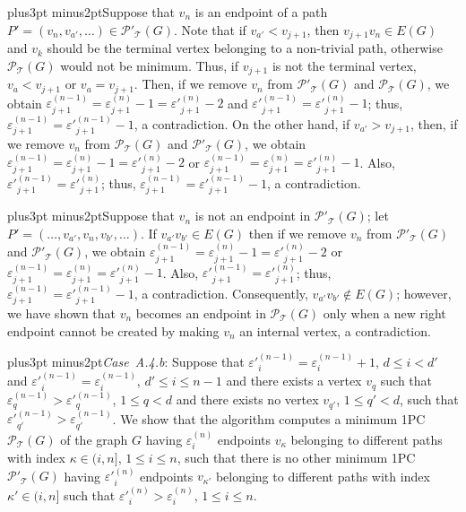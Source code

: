 \documentclass[10pt]{article}
\def\yskip{\penalty-50\vskip3pt plus3pt minus2pt}
\def\y{\yskip}
\begin{document}
{\y Suppose that $v_n$ is an endpoint of a path $P'=(v_n, v_{a'},
\ldots) \in \mathcal{P'_{\mathcal{T}}}(G)$. Note that if
$v_{a'}<v_{j+1}$, then $v_{j+1}v_n \in E(G)$ and $v_k$ should be
the terminal vertex belonging to a non-trivial path, otherwise
$\mathcal{P_{\mathcal{T}}}(G)$ would not be minimum. Thus, if
$v_{j+1}$ is not the terminal vertex, $v_a<v_{j+1}$ or
$v_a=v_{j+1}$. Then, if we remove $v_n$ from
$\mathcal{P'_{\mathcal{T}}}(G)$ and
$\mathcal{P_{\mathcal{T}}}(G)$, we obtain
$\varepsilon^{(n-1)}_{j+1}=\varepsilon^{(n)}_{j+1}-1=\varepsilon'^{(n)}_{j+1}-2$
and $\varepsilon'^{(n-1)}_{j+1}=\varepsilon'^{(n)}_{j+1}-1$; thus,
$\varepsilon^{(n-1)}_{j+1}=\varepsilon'^{(n-1)}_{j+1}-1$, a
contradiction. On the other hand, if $v_{a'}>v_{j+1}$, then, if we
remove $v_n$ from $\mathcal{P_{\mathcal{T}}}(G)$ and
$\mathcal{P'_{\mathcal{T}}}(G)$, we obtain
$\varepsilon^{(n-1)}_{j+1}=\varepsilon^{(n)}_{j+1}-1=\varepsilon'^{(n)}_{j+1}-2$
or
$\varepsilon^{(n-1)}_{j+1}=\varepsilon^{(n)}_{j+1}=\varepsilon'^{(n)}_{j+1}-1$.
Also, $\varepsilon'^{(n-1)}_{j+1}=\varepsilon'^{(n)}_{j+1}$; thus,
$\varepsilon^{(n-1)}_{j+1}=\varepsilon'^{(n-1)}_{j+1}-1$, a
contradiction.

\y Suppose that $v_n$ is not an endpoint in
$\mathcal{P'_{\mathcal{T}}}(G)$; let $P'=(\ldots, v_{a'}, v_n,
v_{b'}, \ldots)$. If $v_{a'}v_{b'} \in E(G)$ then if we remove
$v_n$ from $\mathcal{P'_{\mathcal{T}}}(G)$ and
$\mathcal{P'_{\mathcal{T}}}(G)$, we obtain
$\varepsilon^{(n-1)}_{j+1}=\varepsilon^{(n)}_{j+1}-1=\varepsilon'^{(n)}_{j+1}-2$
or
$\varepsilon^{(n-1)}_{j+1}=\varepsilon^{(n)}_{j+1}=\varepsilon'^{(n)}_{j+1}-1$.
Also, $\varepsilon'^{(n-1)}_{j+1}=\varepsilon'^{(n)}_{j+1}$; thus,
$\varepsilon^{(n-1)}_{j+1}=\varepsilon'^{(n-1)}_{j+1}-1$, a
contradiction. Consequently, $v_{a'}v_{b'} \notin E(G)$; however,
we have shown that $v_n$ becomes an endpoint in
$\mathcal{P_{\mathcal{T}}}(G)$ only when a new right endpoint
cannot be created by making $v_n$ an internal vertex, a
contradiction.


\y \textit{Case~A.4.b}: Suppose that $\varepsilon'^{(n-1)}_i =
\varepsilon^{(n-1)}_i +1$, $d \leq i < d'$ and
$\varepsilon'^{(n-1)}_i = \varepsilon^{(n-1)}_i$, $d' \leq i \leq
n-1$ and there exists a vertex $v_q$ such that
$\varepsilon^{(n-1)}_q > \varepsilon'^{(n-1)}_q$, $1 \leq q < d$
and there exists no vertex $v_{q'}$, $1 \leq q' <d$, such that
$\varepsilon'^{(n-1)}_{q'}>\varepsilon^{(n-1)}_{q'}$. We show that
the algorithm computes a minimum 1PC
$\mathcal{P_{\mathcal{T}}}(G)$ of the graph $G$ having
$\varepsilon^{(n)}_i$ endpoints $v_\kappa$ belonging to different
paths with index $\kappa \in (i,n]$, $1 \leq i \leq n$, such that
there is no other minimum 1PC $\mathcal{P'_{\mathcal{T}}}(G)$
having $\varepsilon'^{(n)}_i$ endpoints $v_{\kappa'}$ belonging to
different paths with index $\kappa' \in (i,n]$ such that
$\varepsilon'^{(n)}_i>\varepsilon^{(n)}_i$, $1 \leq i \leq n$.

}
\end{document}
